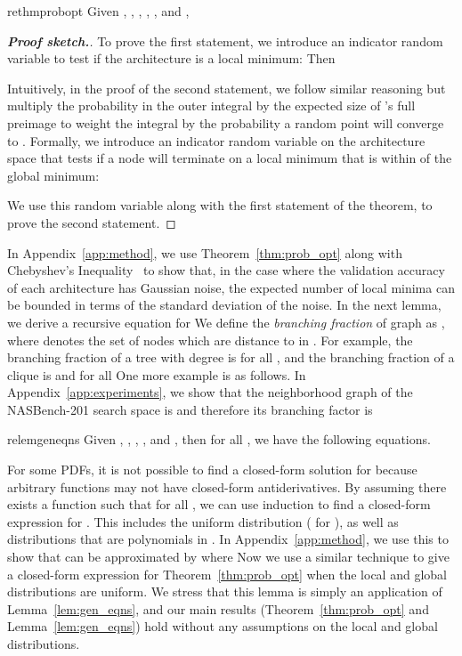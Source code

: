 \begin{restatable}{rethm}{probopt}\label{thm:prob_opt}
Given , , , , , and ,


\end{restatable}


\begin{proof}[\textbf{Proof sketch.}]



To prove the first statement,
we introduce an indicator random variable to test if the 
architecture is a local minimum:  Then

Intuitively, in the proof of the second statement, we follow similar reasoning but multiply
the probability in the outer integral by the expected size of 's full preimage to weight
the integral by the probability a random point will converge to .
Formally, we introduce an indicator random variable on the architecture space 
that tests if a node will terminate on a local minimum that is
within  of the global minimum:

We use this random variable along with the first statement of the theorem,
to prove the second statement.

\end{proof}

In Appendix~\ref{app:method}, we use Theorem~\ref{thm:prob_opt}
along with Chebyshev's Inequality~\citep{chebyshev1867valeurs}
to show that, in the case where the validation accuracy of each architecture
has Gaussian noise, the expected number of local minima can be bounded in terms of
the standard deviation of the noise.
In the next lemma, we derive a recursive equation for 
We define the \emph{branching fraction} of graph  as ,
where  denotes the set of nodes which are distance  to  in .
For example, the branching fraction of a tree with degree  is  for all ,
and the branching fraction of a clique is  and  for all 
One more example is as follows.
In Appendix~\ref{app:experiments}, 
we show that the neighborhood graph of the
NASBench-201 search space is  and therefore its branching factor is


\begin{restatable}{relem}{geneqns}\label{lem:gen_eqns}
Given , , , , and ,
then for all , we have the following equations.


\end{restatable}

For some PDFs, it is not possible to find a closed-form solution
for  because arbitrary 
functions may not have closed-form antiderivatives.
By assuming there exists a function  such that  for all ,
we can use induction to find a closed-form expression for .
This includes the uniform distribution ( for ),
as well as distributions that are polynomials in .
In Appendix~\ref{app:method}, 
we use this to show that 
can be approximated by 
where 
Now we use a similar technique to give a closed-form expression for Theorem~\ref{thm:prob_opt}
when the local and global distributions are uniform.
We stress that this lemma is simply an application of Lemma~\ref{lem:gen_eqns},
and our main results (Theorem~\ref{thm:prob_opt} and Lemma~\ref{lem:gen_eqns})
hold without any assumptions on the local and global distributions.


